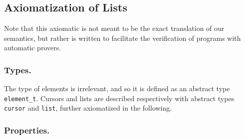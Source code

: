 \documentclass[runningheads,a4paper]{llncs}
\newcommand{\beforesub}{\vspace{-0.2cm}}
\newcommand{\aftersub}{\vspace{-0.1cm}}
\begin{document}
\beforesub
\subsection{Axiomatization of Lists}
\aftersub

Note that this axiomatic is not meant to be the exact translation of our
semantics, but rather is written to facilitate the verification of programs
with automatic provers.

\subsubsection{Types.}

The type of elements is irrelevant, and so it is defined as an abstract
type \verb|element_t|. Cursors and lists are described respectively with abstract types 
\verb|cursor| and \verb|list|, further axiomatized in the following.

\subsubsection{Properties.}
\end{document}
